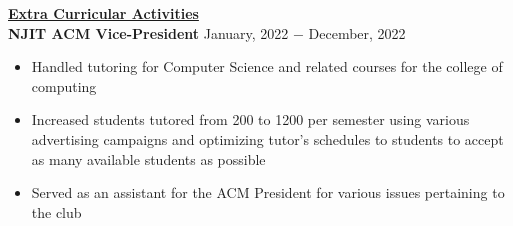 \documentclass{article}
\begin{document}
\noindent \textbf{\underline{Extra Curricular Activities}} \\
\noindent \textbf{NJIT ACM Vice-President} \hfill January, 2022 $-$ December, 2022
\begin{itemize}[noitemsep,nolistsep,leftmargin=*]
\item {Handled tutoring for Computer Science and related courses for the college of computing}
\item {Increased students tutored from 200 to 1200 per semester using various advertising campaigns and optimizing tutor's schedules to students to accept as many available students as possible}
\item {Served as an assistant for the ACM President for various issues pertaining to the club}
\end{itemize}

\end{document}
